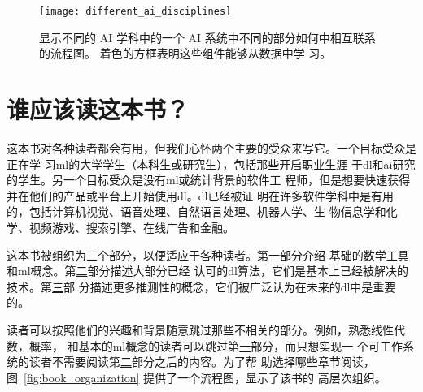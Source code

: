 \begin{figure}[h]
  \centering
  \texttt{[image: different\_ai\_disciplines]}
  \caption{显示不同的 AI 学科中的一个 AI 系统中不同的部分如何中相互联系的流程图。
    着色的方框表明这些组件能够从数据中学
    习。\label{fig:different_ai_disciplines}}
\end{figure}

\section{谁应该读这本书？}
\label{sec:who_should_read_this_book}

这本书对各种读者都会有用，但我们心怀两个主要的受众来写它。一个目标受众是正在学
习\gls*{ml}的大学学生（本科生或研究生），包括那些开启职业生涯
于\gls*{dl}和\gls*{ai}研究的学生。另一个目标受众是没有\gls*{ml}或统计背景的软件工
程师，但是想要快速获得并在他们的产品或平台上开始使用\gls*{dl}。\gls*{dl}已经被证
明在许多软件学科中是有用的，包括计算机视觉、语音处理、自然语言处理、机器人学、生
物信息学和化学、视频游戏、搜索引擎、在线广告和金融。

这本书被组织为三个部分，以便适应于各种读者。第\hyperref[part_basics]{一}部分介绍
基础的数学工具和\gls*{ml}概念。第\hyperref[part_practical]{二}部分描述大部分已经
认可的\gls*{dl}算法，它们是基本上已经被解决的技术。第\hyperref[part_research]{三}部
分描述更多推测性的概念，它们被广泛认为在未来的\gls*{dl}中是重要的。

读者可以按照他们的兴趣和背景随意跳过那些不相关的部分。例如，熟悉线性代数，概率，
和基本的\gls*{ml}概念的读者可以跳过第\hyperref[part_basics]{一}部分，而只想实现一
个可工作系统的读者不需要阅读第\hyperref[part_practical]{二}部分之后的内容。为了帮
助选择哪些章节阅读，图~\ref{fig:book_organization} 提供了一个流程图，显示了该书的
高层次组织。

